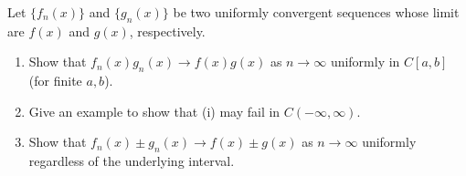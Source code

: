 \begingroup
\renewcommand{\labelenumi}{(\roman{enumi})}
\begin{exercise}
  \label{ex:hw06:uniform-algebra}
  Let $\{f_n(x)\}$ and $\{g_n(x)\}$ be two uniformly convergent
  sequences whose limit are $f(x)$ and $g(x)$, respectively.
  \begin{enumerate}
    \item Show that $f_n(x)g_n(x)\to f(x)g(x)$ as $n\to\infty$
      uniformly in $C[a,b]$ (for finite $a,b$).
    \item Give an example to show that (i) may fail in $C(-\infty,\infty)$.
    \item Show that $f_n(x)\pm g_n(x)\to f(x)\pm g(x)$ as
      $n\to\infty$ uniformly regardless of the underlying interval.
  \end{enumerate}
\end{exercise}
\endgroup
